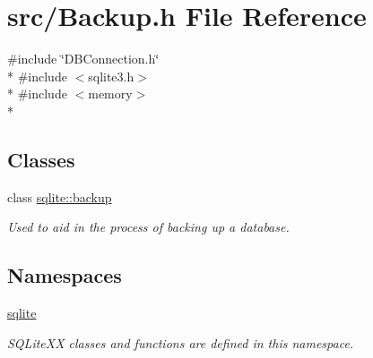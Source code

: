 \hypertarget{a00018}{\section{src/\-Backup.h File Reference}
\label{a00018}
}
{\ttfamily \#include \char`\"{}D\-B\-Connection.\-h\char`\"{}}\\*
{\ttfamily \#include $<$sqlite3.\-h$>$}\\*
{\ttfamily \#include $<$memory$>$}\\*
\subsection*{Classes}
\begin{DoxyCompactItemize}
\item 
class \hyperlink{a00001}{sqlite\-::backup}
\begin{DoxyCompactList}\small\item\em Used to aid in the process of backing up a database. \end{DoxyCompactList}\end{DoxyCompactItemize}
\subsection*{Namespaces}
\begin{DoxyCompactItemize}
\item 
\hyperlink{a00038}{sqlite}
\begin{DoxyCompactList}\small\item\em S\-Q\-Lite\-X\-X classes and functions are defined in this namespace. \end{DoxyCompactList}\end{DoxyCompactItemize}
